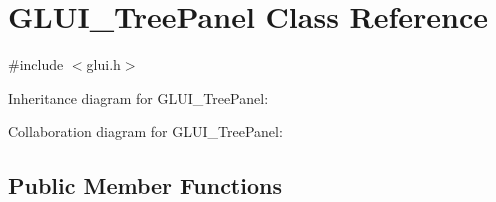 \hypertarget{class_g_l_u_i___tree_panel}{\section{G\+L\+U\+I\+\_\+\+Tree\+Panel Class Reference}
\label{class_g_l_u_i___tree_panel}
}


{\ttfamily \#include $<$glui.\+h$>$}



Inheritance diagram for G\+L\+U\+I\+\_\+\+Tree\+Panel\+:


Collaboration diagram for G\+L\+U\+I\+\_\+\+Tree\+Panel\+:
\subsection*{Public Member Functions}
